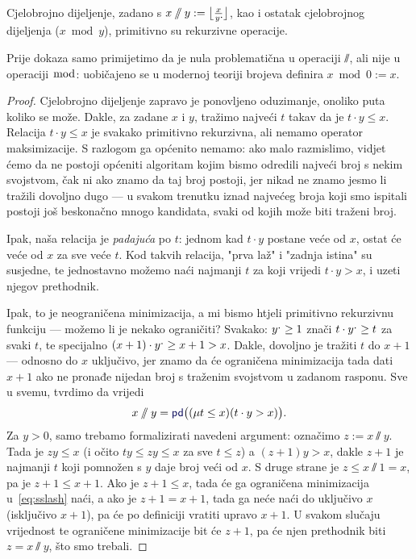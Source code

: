 \begin{propozicija}\label{prop:divmodprn}
    Cjelobrojno dijeljenje, zadano s $x\sslash y:=\bigl\lfloor\frac{x}{y\sp{\text{\normalsize.}}\!}\bigr\rfloor$, kao i ostatak cjelobrojnog dijeljenja ($x\bmod y$), primitivno su rekurzivne operacije.
\end{propozicija}
Prije dokaza samo primijetimo da je nula problematična u operaciji $\sslash$, ali nije u operaciji $\bmod$: uobičajeno se u modernoj teoriji brojeva definira $x\bmod 0:=x$.
\begin{proof}
Cjelobrojno dijeljenje zapravo je ponovljeno oduzimanje, onoliko puta koliko se može. Dakle, za zadane $x$ i $y$, tražimo najveći $t$ takav da je $t\cdot y\le x$. Relacija $t\cdot y\le x$ je svakako primitivno rekurzivna, ali nemamo operator maksimizacije. S razlogom ga općenito nemamo: ako malo razmislimo, vidjet ćemo da ne postoji općeniti algoritam kojim bismo odredili najveći broj s nekim svojstvom, čak ni ako znamo da taj broj postoji, jer nikad ne znamo jesmo li tražili dovoljno dugo --- u svakom trenutku iznad najvećeg broja koji smo ispitali postoji još beskonačno mnogo kandidata, svaki od kojih može biti traženi broj.

Ipak, naša relacija je \emph{padajuća} po $t$: jednom kad $t\cdot y$ postane veće od $x$, ostat će veće od $x$ za sve veće $t$. Kod takvih relacija, "prva laž" i "zadnja istina" su susjedne, te jednostavno možemo naći najmanji $t$ za koji vrijedi $t\cdot y>x$, i uzeti njegov prethodnik.

Ipak, to je neograničena minimizacija, a mi bismo htjeli primitivno rekurzivnu funkciju --- možemo li je nekako ograničiti? Svakako: $y\sp{\text{\normalsize.}}\ge 1$ znači $t\cdot y\sp{\text{\normalsize.}}\ge t$ za svaki $t$, te specijalno $(x+1)\cdot y\sp{\text{\normalsize.}}\ge x+1>x$. Dakle, dovoljno je tražiti $t$ do $x+1$ --- odnosno do $x$ uključivo, jer znamo da će ograničena minimizacija tada dati $x+1$ ako ne pronađe nijedan broj s traženim svojstvom u zadanom rasponu. Sve u svemu, tvrdimo da vrijedi
\begin{equation}\label{eq:sslash}
    x\sslash y=\f{pd}\bigl((\mu t\le x)(t\cdot y>x)\bigr)\text.
\end{equation}
Za $y>0$, samo trebamo formalizirati navedeni argument: označimo $z:=x\sslash y$. Tada je $zy\le x$ (i očito $ty\le zy\le x$ za sve $t\le z$) a $(z+1)y>x$, dakle $z+1$ je najmanji $t$ koji pomnožen s $y$ daje broj veći od $x$. S druge strane je $z\le x\sslash1=x$, pa je $z+1\le x+1$. Ako je $z+1\le x$, tada će ga ograničena minimizacija u~\eqref{eq:sslash} naći, a ako je $z+1=x+1$, tada ga neće naći do uključivo $x$ (isključivo $x+1$), pa će po definiciji vratiti upravo $x+1$. U svakom slučaju vrijednost te ograničene minimizacije bit će $z+1$, pa će njen prethodnik biti $z=x\sslash y$, što smo trebali.


\end{proof}
